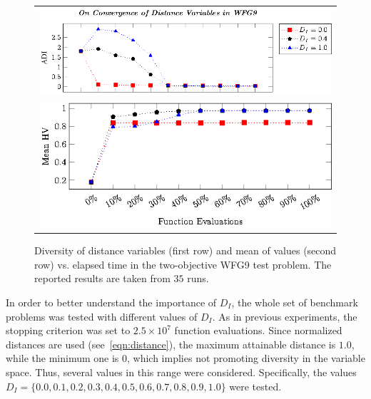\begin{figure}[t]
\centering
\begin{tabular}{l}
 \includegraphics[scale=0.75]{images/Diversity_Long_Term_tikz_WFG9-figure0.eps}\\[0cm]%
 \includegraphics[scale=0.75]{images/Diversity_Long_Term_tikz_WFG9-figure1.eps}\\[0cm]%
\end{tabular}
\caption{Diversity of distance variables (first row) and mean of \HV{} values (second row) vs. elapsed time in the two-objective WFG9 test problem. The reported results are taken from $35$ runs.}\label{fig:WFG9_Diversity}
\end{figure}



In order to better understand the importance of $D_I$, the whole set of benchmark problems was tested with different values
of $D_I$.
%
As in previous experiments, the stopping criterion was set to $2.5 \times 10^7$ function evaluations.
%
Since normalized distances are used (see~\ref{eqn:distance}), the maximum attainable distance is $1.0$, while
the minimum one is $0$, which implies not promoting diversity in the variable space.
%
Thus, several values in this range were considered.
%
Specifically, the values $D_I = \{0.0, 0.1, 0.2, 0.3, 0.4, 0.5, 0.6, 0.7, 0.8, 0.9, 1.0\}$ were tested.

